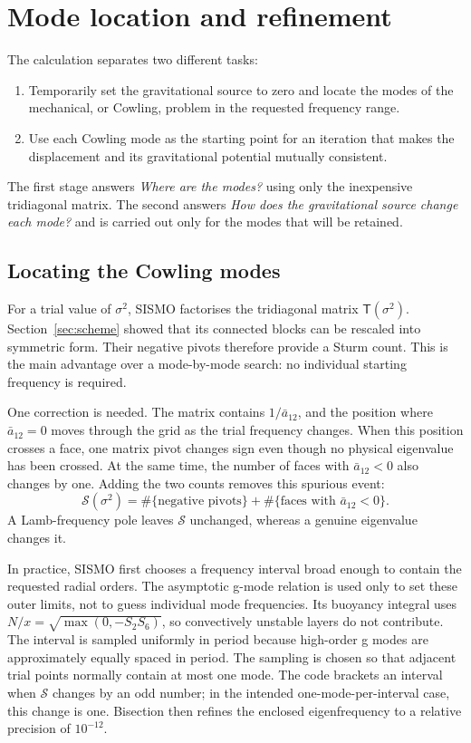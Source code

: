\documentclass[]{aa}
\begin{document}
\section{Mode location and refinement}
\label{sec:sturm}

The calculation separates two different tasks:
\begin{enumerate}
\item Temporarily set the gravitational source to zero and locate the modes of the mechanical, or Cowling, problem in the requested frequency range.
\item Use each Cowling mode as the starting point for an iteration that makes the displacement and its gravitational potential mutually consistent.
\end{enumerate}
The first stage answers \emph{Where are the modes?} using only the inexpensive tridiagonal matrix. The second answers \emph{How does the gravitational source change each mode?} and is carried out only for the modes that will be retained.

\subsection{Locating the Cowling modes}

For a trial value of $\sigma^2$, SISMO factorises the tridiagonal matrix $\mathsf{T}(\sigma^2)$. Section~\ref{sec:scheme} showed that its connected blocks can be rescaled into symmetric form. Their negative pivots therefore provide a Sturm count. This is the main advantage over a mode-by-mode search: no individual starting frequency is required.

One correction is needed. The matrix contains $1/\bar a_{12}$, and the position where $\bar a_{12}=0$ moves through the grid as the trial frequency changes. When this position crosses a face, one matrix pivot changes sign even though no physical eigenvalue has been crossed. At the same time, the number of faces with $\bar a_{12}<0$ also changes by one. Adding the two counts removes this spurious event:
\begin{equation}
\mathcal{S}(\sigma^2)
=
\#\{\text{negative pivots}\}
+
\#\{\text{faces with }\bar a_{12}<0\}.
\label{eq:indicator}
\end{equation}
A Lamb-frequency pole leaves $\mathcal{S}$ unchanged, whereas a genuine eigenvalue changes it.

In practice, SISMO first chooses a frequency interval broad enough to contain the requested radial orders. The asymptotic g-mode relation is used only to set these outer limits, not to guess individual mode frequencies.  Its buoyancy integral uses $N/x=\sqrt{\max(0,-S_2S_6)}$, so convectively unstable layers do not contribute. The interval is sampled uniformly in period because high-order g modes are approximately equally spaced in period. The sampling is chosen so that adjacent trial points normally contain at most one mode. The code brackets an interval when $\mathcal{S}$ changes by an odd number; in the intended one-mode-per-interval case, this change is one. Bisection then refines the enclosed eigenfrequency to a relative precision of $10^{-12}$.
\end{document}
